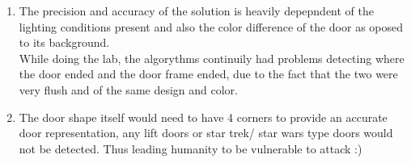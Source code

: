 \documentclass{article}
\begin{document}
\begin{enumerate}
	\item The precision and accuracy of the solution is heavily depepndent of the lighting conditions present and also the color difference of the door as oposed to its background.\\ While doing the lab, the algorythms continuily had problems detecting where the door ended and the door frame ended, due to the fact that the two were very flush and of the same design and color.
	\item The door shape itself would need to have 4 corners to provide an accurate door representation, any lift doors or star trek/ star wars type doors would not be detected. Thus leading humanity to be vulnerable to attack :)
\end{enumerate}











\pagebreak
\end{document}
